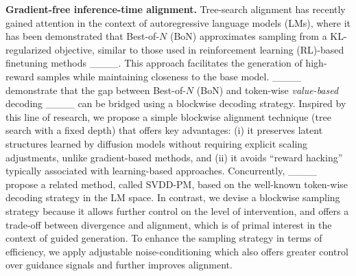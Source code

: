 \textbf{Gradient-free inference-time alignment.} Tree-search alignment has recently gained attention in the context of autoregressive language models (LMs), where it has been demonstrated that Best-of-$N$ (BoN) approximates sampling from a KL-regularized objective, similar to those used in reinforcement learning (RL)-based finetuning methods ____. This approach facilitates the generation of high-reward samples while maintaining closeness to the base model. ____ demonstrate that the gap between Best-of-$N$ (BoN) and token-wise {\em value-based} decoding ____ can be bridged using a blockwise decoding strategy. Inspired by this line of research, we propose a simple blockwise alignment technique (tree search with a fixed depth) that offers key advantages: (i) it preserves latent structures learned by diffusion models without requiring explicit scaling adjustments, unlike gradient-based methods, and (ii) it avoids ``reward hacking'' typically associated with learning-based approaches. Concurrently, ____ propose a related method, called SVDD-PM, based on the well-known token-wise decoding strategy in the LM space. In contrast, we devise a blockwise sampling strategy because it allows further control on the level of intervention, and offers a trade-off between divergence and alignment, which is of primal interest in the context of guided generation. To enhance the sampling strategy in terms of efficiency, we apply adjustable noise-conditioning which also offers greater control over guidance signals and further improves alignment. 


\vspace{-.1in}